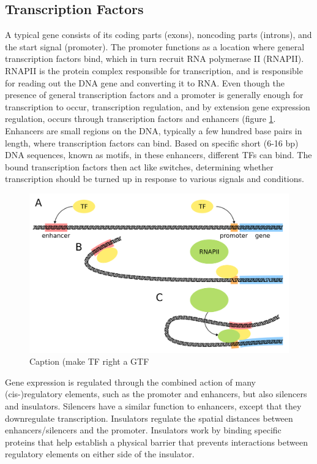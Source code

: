 \subsection{Transcription Factors}

A typical gene consists of its coding parts (exons), noncoding parts (introns), and the start signal (promoter). The promoter functions as a location where general transcription factors bind, which in turn recruit RNA polymerase II (RNAPII). RNAPII is the protein complex responsible for transcription, and is responsible for reading out the DNA gene and converting it to RNA. Even though the presence of general transcription factors and a promoter is generally enough for transcription to occur\cite{Haberle2018}, transcription regulation, and by extension gene expression regulation, occurs through transcription factors and enhancers (figure \ref{fig:TF}. Enhancers are small regions on the DNA, typically a few hundred base pairs in length, where transcription factors can bind. Based on specific short (6-16 bp) DNA sequences, known as motifs, in these enhancers, different TFs can bind. The bound transcription factors then act like switches, determining whether transcription should be turned up in response to various signals and conditions.

\begin{figure}[h]
    \center
    \includegraphics[width=0.65\linewidth]{ch.introduction/imgs/transcription_factor.png}
    \caption{Caption (make TF right a GTF}
    \label{fig:TF}
\end{figure}

Gene expression is regulated through the combined action of many (cis-)regulatory elements, such as the promoter and enhancers, but also silencers and insulators\cite{Spitz2012}. Silencers have a similar function to enhancers, except that they downregulate transcription. Insulators regulate the spatial distances between enhancers/silencers and the promoter. Insulators work by binding specific proteins that help establish a physical barrier that prevents interactions between regulatory elements on either side of the insulator. 

